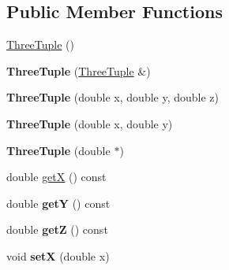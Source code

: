 \subsection*{Public Member Functions}
\begin{DoxyCompactItemize}
\item 
\hyperlink{classCartWheel_1_1Math_1_1ThreeTuple_a68c41a32438f1dbdeeb9a39f56ba59a3}{ThreeTuple} ()
\item 
\hypertarget{classCartWheel_1_1Math_1_1ThreeTuple_a05a23bfab5ec59515bbdf85e106e55dd}{
{\bfseries ThreeTuple} (\hyperlink{classCartWheel_1_1Math_1_1ThreeTuple}{ThreeTuple} \&)}
\label{classCartWheel_1_1Math_1_1ThreeTuple_a05a23bfab5ec59515bbdf85e106e55dd}

\item 
\hypertarget{classCartWheel_1_1Math_1_1ThreeTuple_ad1d82fd960564621f02e656219815668}{
{\bfseries ThreeTuple} (double x, double y, double z)}
\label{classCartWheel_1_1Math_1_1ThreeTuple_ad1d82fd960564621f02e656219815668}

\item 
\hypertarget{classCartWheel_1_1Math_1_1ThreeTuple_a89daaebe6e08cac4136268316edc19d2}{
{\bfseries ThreeTuple} (double x, double y)}
\label{classCartWheel_1_1Math_1_1ThreeTuple_a89daaebe6e08cac4136268316edc19d2}

\item 
\hypertarget{classCartWheel_1_1Math_1_1ThreeTuple_a70977fbf0b030e80cc719affc8ed0b52}{
{\bfseries ThreeTuple} (double $\ast$)}
\label{classCartWheel_1_1Math_1_1ThreeTuple_a70977fbf0b030e80cc719affc8ed0b52}

\item 
double \hyperlink{classCartWheel_1_1Math_1_1ThreeTuple_af23915ba2673d2afc2a0b51449576529}{getX} () const 
\item 
\hypertarget{classCartWheel_1_1Math_1_1ThreeTuple_aec63a0d43a5d290c501f0a46e66f576e}{
double {\bfseries getY} () const }
\label{classCartWheel_1_1Math_1_1ThreeTuple_aec63a0d43a5d290c501f0a46e66f576e}

\item 
\hypertarget{classCartWheel_1_1Math_1_1ThreeTuple_a2d6d4ba52749ffacc0e3af3806ab9360}{
double {\bfseries getZ} () const }
\label{classCartWheel_1_1Math_1_1ThreeTuple_a2d6d4ba52749ffacc0e3af3806ab9360}

\item 
\hypertarget{classCartWheel_1_1Math_1_1ThreeTuple_a3dbf59eb6b5b0f4d65bcea1d0de7a883}{
void {\bfseries setX} (double x)}
\label{classCartWheel_1_1Math_1_1ThreeTuple_a3dbf59eb6b5b0f4d65bcea1d0de7a883}


\end{DoxyCompactItemize}
